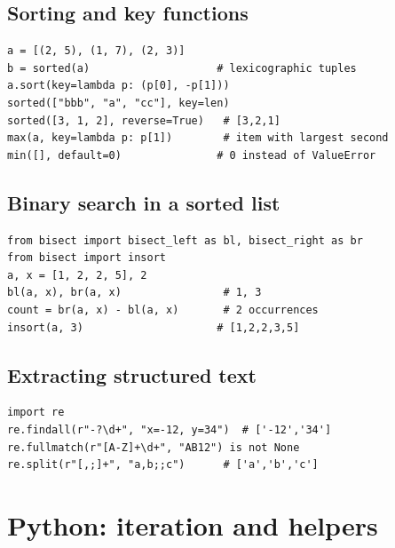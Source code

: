\subsection{Sorting and key functions}
\begin{lstlisting}[label=py:sorting]
a = [(2, 5), (1, 7), (2, 3)]
b = sorted(a)                    # lexicographic tuples
a.sort(key=lambda p: (p[0], -p[1]))
sorted(["bbb", "a", "cc"], key=len)
sorted([3, 1, 2], reverse=True)   # [3,2,1]
max(a, key=lambda p: p[1])        # item with largest second
min([], default=0)               # 0 instead of ValueError
\end{lstlisting}

\subsection{Binary search in a sorted list}
\begin{lstlisting}[label=py:bisect]
from bisect import bisect_left as bl, bisect_right as br
from bisect import insort
a, x = [1, 2, 2, 5], 2
bl(a, x), br(a, x)                # 1, 3
count = br(a, x) - bl(a, x)       # 2 occurrences
insort(a, 3)                     # [1,2,2,3,5]
\end{lstlisting}

\subsection{Extracting structured text}
\begin{lstlisting}[label=py:regex]
import re
re.findall(r"-?\d+", "x=-12, y=34")  # ['-12','34']
re.fullmatch(r"[A-Z]+\d+", "AB12") is not None
re.split(r"[,;]+", "a,b;;c")      # ['a','b','c']
\end{lstlisting}

\section{Python: iteration and helpers}

